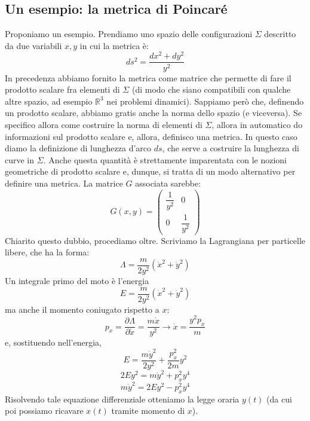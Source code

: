 \documentclass[a4paper,openany]{article}
\begin{document}
	\subsection{Un esempio: la metrica di Poincaré}
	Proponiamo un esempio. Prendiamo uno spazio delle configurazioni $\Sigma$ descritto da due variabili $x,y$ in cui la metrica è:
	$$
	ds^2 = \dfrac{dx^2 + dy^2}{y^2}
	$$
	In precedenza abbiamo fornito la metrica come matrice che permette di fare il prodotto scalare fra elementi di $\Sigma$ (di modo che siano compatibili con qualche altre spazio, ad esempio $\mathbb{R}^3$ nei problemi dinamici). Sappiamo però che, definendo un prodotto scalare, abbiamo gratis anche la norma dello spazio (e viceversa). Se specifico allora come costruire la norma di elementi di $\Sigma$, allora in automatico do informazioni sul prodotto scalare e, allora, definisco una metrica. In questo caso diamo la definizione di lunghezza d'arco $ds$, che serve a costruire la lunghezza di curve in $\Sigma$. Anche questa quantità è strettamente imparentata con le nozioni geometriche di prodotto scalare e, dunque, si tratta di un modo alternativo per definire una metrica. La matrice $G$ associata sarebbe:
	\begin{equation}\label{key}
		G(x,y) = 
		\begin{pmatrix}
			\dfrac{1}{y^2} & 0 \\
			0 & \dfrac{1}{y^2}
		\end{pmatrix}
	\end{equation}
	Chiarito questo dubbio, procediamo oltre. Scriviamo la Lagrangiana per particelle libere, che ha la forma:
	\begin{equation}\label{key}
		\Lambda = \dfrac{m}{2y^2}(\dot{x}^2+\dot{y}^2)
	\end{equation}
	Un integrale primo del moto è l'energia
	\begin{equation}\label{key}
		E = \dfrac{m}{2y^2}(\dot{x}^2+\dot{y}^2)
	\end{equation}
	ma anche il momento coniugato rispetto a $x$:
	\begin{equation}\label{key}
		p_{x} = \dfrac{\partial \Lambda}{\partial \dot{x}} = \dfrac{m\dot{x}}{y^2} \longrightarrow \dot{x} = \dfrac{y^2 p_x}{m}
	\end{equation}
	e, sostituendo nell'energia,
	\begin{equation}\label{key}
		E = \dfrac{m\dot{y}^2}{2y^2} + \dfrac{p_x^2}{2m}y^2
	\end{equation}
	$$
	2Ey^2 = m\dot{y}^2+ p_x^{2} y^4
	$$
	$$
	m\dot{y}^2 = 2Ey^2 - p_x^{2} y^4 
	$$
	Risolvendo tale equazione differenziale otteniamo la legge oraria $y(t)$ (da cui poi possiamo ricavare $x(t)$ tramite momento di $x$).
\end{document}
